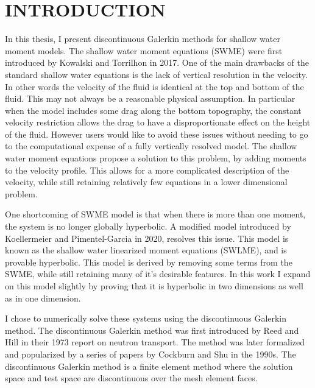 \chapter{INTRODUCTION}

In this thesis, I present discontinuous Galerkin methods for shallow water moment
models.
The shallow water moment equations (SWME) were first introduced by Kowalski and
Torrilhon\cite{kowalski2017moment} in 2017.
One of the main drawbacks of the standard shallow water equations is the lack of
vertical resolution in the velocity.
In other words the velocity of the fluid is identical at the top and bottom of the
fluid.
This may not always be a reasonable physical assumption.
In particular when the model includes some drag along the bottom topography, the
constant velocity restriction allows the drag to have a disproportionate effect on the
height of the fluid.
However users would like to avoid these issues without needing to go to the
computational expense of a fully vertically resolved model.
The shallow water moment equations propose a solution to this problem, by adding
moments to the velocity profile.
This allows for a more complicated description of the velocity, while still retaining
relatively few equations in a lower dimensional problem.

One shortcoming of SWME model is that when there is more than one moment, the system
is no longer globally hyperbolic.
A modified model introduced by Koellermeier and
Pimentel-Garcia\cite{koellermeier2020steady} in 2020, resolves this issue.
This model is known as the shallow water linearized moment equations (SWLME), and
is provable hyperbolic.
This model is derived by removing some terms from the SWME, while still retaining
many of it's desirable features.
In this work I expand on this model slightly by proving that it is hyperbolic in
two dimensions as well as in one dimension.

I chose to numerically solve these systems using the discontinuous Galerkin method.
The discontinuous Galerkin method was first introduced by Reed and
Hill\cite{techreport:Reed1973} in their 1973 report on neutron transport.
The method was later formalized and popularized by a series of papers by Cockburn and
Shu\cite{article:Cockburn1989II,article:Cockburn1991I,article:Cockburn1989III,article:Cockburn1990IV,article:Cockburn1998V}
in the 1990s.
The discontinuous Galerkin method is a finite element method where the solution space
and test space are discontinuous over the mesh element faces.

